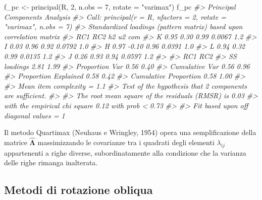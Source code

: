 \documentclass[
  11pt,
]{krantz}
\makeatletter
\newenvironment{Shaded}{\begin{snugshade}}{\end{snugshade}}
\newcommand{\AttributeTok}[1]{\textcolor[rgb]{0.61,0.61,0.61}{#1}}
\newcommand{\CommentTok}[1]{\textcolor[rgb]{0.37,0.37,0.37}{\textit{#1}}}
\newcommand{\DecValTok}[1]{\textcolor[rgb]{0.06,0.06,0.06}{#1}}
\newcommand{\FunctionTok}[1]{\textcolor[rgb]{0,0,0}{#1}}
\newcommand{\NormalTok}[1]{#1}
\newcommand{\OtherTok}[1]{\textcolor[rgb]{0.37,0.37,0.37}{#1}}
\newcommand{\StringTok}[1]{\textcolor[rgb]{0.5,0.5,0.5}{#1}}
\newenvironment{kframe}{%
\medskip{}
\setlength{\fboxsep}{.8em}
 \def\at@end@of@kframe{}%
 \ifinner\ifhmode%
  \def\at@end@of@kframe{\end{minipage}}%
  \begin{minipage}{\columnwidth}%
 \fi\fi%
 \def\FrameCommand##1{\hskip\@totalleftmargin \hskip-\fboxsep
 \colorbox{shadecolor}{##1}\hskip-\fboxsep
     \hskip-\linewidth \hskip-\@totalleftmargin \hskip\columnwidth}%
 \MakeFramed {\advance\hsize-\width
   \@totalleftmargin\z@ \linewidth\hsize
   \@setminipage}}%
 {\par\unskip\endMakeFramed%
 \at@end@of@kframe}
\renewenvironment{Shaded}{\begin{kframe}}{\end{kframe}}
\theoremstyle{definition}
\theoremstyle{definition}
\theoremstyle{definition}
\theoremstyle{definition}
\theoremstyle{remark}
\makeatother
\begin{document}
\begin{Shaded}
\begin{Highlighting}[]
\NormalTok{f\_pc }\OtherTok{\textless{}{-}} \FunctionTok{principal}\NormalTok{(R, }\DecValTok{2}\NormalTok{, }\AttributeTok{n.obs =} \DecValTok{7}\NormalTok{, }\AttributeTok{rotate =} \StringTok{"varimax"}\NormalTok{)}
\NormalTok{f\_pc}
\CommentTok{\#\textgreater{} Principal Components Analysis}
\CommentTok{\#\textgreater{} Call: principal(r = R, nfactors = 2, rotate = "varimax", n.obs = 7)}
\CommentTok{\#\textgreater{} Standardized loadings (pattern matrix) based upon correlation matrix}
\CommentTok{\#\textgreater{}    RC1   RC2   h2     u2 com}
\CommentTok{\#\textgreater{} K 0.95  0.30 0.99 0.0067 1.2}
\CommentTok{\#\textgreater{} I 0.03  0.96 0.92 0.0792 1.0}
\CommentTok{\#\textgreater{} H 0.97 {-}0.10 0.96 0.0391 1.0}
\CommentTok{\#\textgreater{} L 0.94  0.32 0.99 0.0135 1.2}
\CommentTok{\#\textgreater{} J 0.26  0.93 0.94 0.0597 1.2}
\CommentTok{\#\textgreater{} }
\CommentTok{\#\textgreater{}                        RC1  RC2}
\CommentTok{\#\textgreater{} SS loadings           2.81 1.99}
\CommentTok{\#\textgreater{} Proportion Var        0.56 0.40}
\CommentTok{\#\textgreater{} Cumulative Var        0.56 0.96}
\CommentTok{\#\textgreater{} Proportion Explained  0.58 0.42}
\CommentTok{\#\textgreater{} Cumulative Proportion 0.58 1.00}
\CommentTok{\#\textgreater{} }
\CommentTok{\#\textgreater{} Mean item complexity =  1.1}
\CommentTok{\#\textgreater{} Test of the hypothesis that 2 components are sufficient.}
\CommentTok{\#\textgreater{} }
\CommentTok{\#\textgreater{} The root mean square of the residuals (RMSR) is  0.03 }
\CommentTok{\#\textgreater{}  with the empirical chi square  0.12  with prob \textless{}  0.73 }
\CommentTok{\#\textgreater{} }
\CommentTok{\#\textgreater{} Fit based upon off diagonal values = 1}
\end{Highlighting}
\end{Shaded}

Il metodo Quartimax (Neuhaus e Wringley, 1954) opera una semplificazione della matrice \(\hat{\boldsymbol{\Lambda}}\) massimizzando le covarianze tra i quadrati degli elementi \(\lambda_{ij}\) appartenenti a righe diverse, subordinatamente alla condizione che la varianza delle righe rimanga inalterata.

\hypertarget{metodi-di-rotazione-obliqua}{%
\subsection{Metodi di rotazione obliqua}\label{metodi-di-rotazione-obliqua}}
\end{document}
